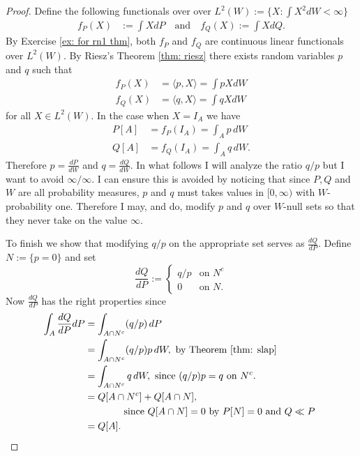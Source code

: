 \begin{proof}
Define the following functionals over over $L^2(W):=\{X\colon \int X^2 dW <\infty \}$
\begin{align*}
f_P(X) &:= \int X dP \quad\text{and}\quad f_Q(X) := \int X dQ.
\end{align*}
By Exercise \ref{ex: for rn1 thm}, both $f_P$ and $f_Q$ are continuous linear functionals over $L^2(W)$. By Riesz's Theorem \ref{thm: riesz} there exists random variables $p$ and $q$ such that
\begin{align*}
f_P(X) &= \langle p,  X\rangle = \int p X dW\\
f_Q(X) &= \langle q,  X\rangle = \int q X dW
\end{align*}
for all $X\in L^2(W)$. In the case when $X= I_A$ we have
\begin{align*}
P[A] &= f_P(I_A) = \int_A p  \,dW \\
Q[A] &= f_Q(I_A) = \int_A q  \,dW.
\end{align*}
Therefore $p = \frac{dP}{dW}$ and $q = \frac{dQ}{dW}.$
In what follows I will analyze the ratio $q/p$ but I want to avoid $\infty /\infty$. I can ensure this is avoided by noticing that since $P,Q$ and $W$ are all probability measures, $p$ and $q$ must takes values in $[0,\infty)$ with $W$-probability one. Therefore I may, and do, modify $p$ and $q$ over $W$-null sets so that they never take on the value $\infty$.

To finish we show that modifying $q/p$ on the appropriate  set serves as $\frac{dQ}{dP}$. Define
$N:= \{p=0\}$ and set
\begin{equation}
\frac{dQ}{dP}:=\begin{cases}
q/p & \text{on $N^c$} \\
0  & \text{on $N$}.
\end{cases}
\end{equation}
Now $\frac{dQ}{dP}$ has the right properties since
\begin{align*}
\int_A \frac{dQ}{dP} dP &= \int_{A\cap N^c} (q /p) \,dP \\
&= \int_{A\cap N^c} (q/p) p\,dW,\,\,\text{by Theorem \ref{thm: slap}}  \\
&= \int_{A\cap N^c} q\, dW,\,\,\text{since $(q/p) p=q$ on $N^c$.}   \\
& = Q[A\cap N^c] + Q[A\cap N],\\
&\qquad\qquad \text{since $Q[A\cap N]=0$ by $P[N]=0$ and $Q\ll P$ }\\
& = Q[A].
\end{align*}
\end{proof}


